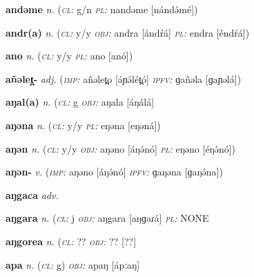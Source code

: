 \newentry
\headword\textbf{andəme}
\ipa{[ándə́mé]}
\synpos\textit{n.} 
\class(\textit{\textsc{cl:}} {g/n}
\plural\textit{\textsc{pl:}} nandəme [nándə́mé])

\newentry
\headword\textbf{andr(a)}
\ipa{[ándŕ(á)]}
\synpos\textit{n.} 
\class(\textit{\textsc{cl:}} {y/y}
\object\textit{\textsc{obj:}} andra [ándŕá]
\plural\textit{\textsc{pl:}} endra [éndŕá])

\newentry
\headword\textbf{ano}
\ipa{[anó]}
\synpos\textit{n.} 
\class(\textit{\textsc{cl:}} {y/y}
\plural\textit{\textsc{pl:}} ano [anó])

\newentry
\headword\textbf{añəlet̪-}
\ipa{[áɲə́lét̪-]}
\synpos\textit{adj.} 
\imperative(\textit {\textsc{imp:}} añəlet̪o [áɲə́lét̪ó] 
\imperfective\textit{\textsc{ipfv:}} ɡañəla [ɡaɲəlá])

\newentry
\headword\textbf{aŋal(a)}
\ipa{[áŋál(á)]}
\synpos\textit{n.} 
\class(\textit{\textsc{cl:}} {g}
\object\textit{\textsc{obj:}} aŋala [áŋálá]

\newentry
\headword\textbf{aŋəna}
\ipa{[aŋəná]}
\synpos\textit{n.} 
\class(\textit{\textsc{cl:}} {y/y}
\plural\textit{\textsc{pl:}} eŋəna [eŋəná])

\newentry
\headword\textbf{aŋən}
\ipa{[áŋə́n]}
\synpos\textit{n.} 
\class(\textit{\textsc{cl:}} {y/y}
\object\textit{\textsc{obj:}} aŋəno [áŋə́nó]
\plural\textit{\textsc{pl:}} eŋəno [éŋə́nó])

\newentry
\headword\textbf{aŋən-}
\ipa{[áŋə́n-]}
\synpos\textit{v.} 
\imperative(\textit {\textsc{imp:}} aŋəno [áŋə́nó] 
\imperfective\textit{\textsc{ipfv:}} ɡaŋəna [ɡaŋə́na])

\newentry
\headword\textbf{aŋgaca} 
\ipa{[aŋgatʃa]} 
\synpos\textit{adv.} 

\newentry
\headword\textbf{aŋgara}  
\ipa{[aŋɡaɾá]}  
\synpos\textit{n.} 
\class(\textit{\textsc{cl:}} {j}
\object\textit{\textsc{obj:}} aŋgara [aŋɡaɾá]
\plural\textit{\textsc{pl:}} NONE

\newentry
\headword\textbf{aŋgorea}
\ipa{[aŋgoɾea]}
\synpos\textit{n.} 
\class(\textit{\textsc{cl:}} {??}
\object\textit{\textsc{obj:}} ?? [??] %

\newentry
\headword\textbf{apa}
\ipa{[ápːa]}
\synpos\textit{n.} 
\class(\textit{\textsc{cl:}} {g})
\object\textit{\textsc{obj:}} apaŋ [ápːaŋ]


